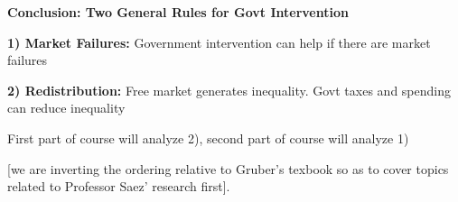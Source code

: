\documentclass[landscape]{slides}
\begin{document}
%
%
%

\begin{slide}
\begin{center}
{\bf Conclusion: Two General Rules for Govt Intervention}
\end{center}

\textbf{1) Market Failures:} Government intervention can help
if there are market failures

\textbf{2) Redistribution:} Free market generates inequality. Govt taxes
and spending can reduce inequality 

First part of course will analyze 2), second part of course will analyze 1) 

[we are inverting the ordering relative to Gruber's texbook so as to cover topics related to Professor Saez'
research first].

\end{slide}


%
%
%
%
%
%
%
\end{document}

